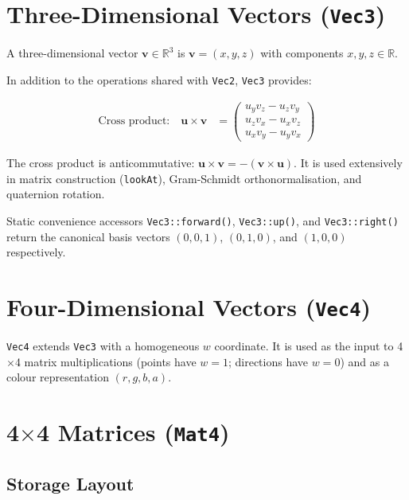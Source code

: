 \section{Three-Dimensional Vectors (\texttt{Vec3})}

\begin{definition}[3-Vector]
A three-dimensional vector $\mathbf{v} \in \mathbb{R}^3$ is
$\mathbf{v} = (x, y, z)$ with components $x, y, z \in \mathbb{R}$.
\end{definition}

In addition to the operations shared with \texttt{Vec2}, \texttt{Vec3}
provides:

\begin{align}
  \text{Cross product:} \quad
  \mathbf{u} \times \mathbf{v} &=
  \begin{pmatrix} u_y v_z - u_z v_y \\ u_z v_x - u_x v_z \\ u_x v_y - u_y v_x \end{pmatrix}
\end{align}

The cross product is anticommutative: $\mathbf{u} \times \mathbf{v} = -(\mathbf{v} \times \mathbf{u})$.
It is used extensively in matrix construction (\texttt{lookAt}),
Gram-Schmidt orthonormalisation, and quaternion rotation.

Static convenience accessors \texttt{Vec3::forward()}, \texttt{Vec3::up()},
and \texttt{Vec3::right()} return the canonical basis vectors
$(0,0,1)$, $(0,1,0)$, and $(1,0,0)$ respectively.

\section{Four-Dimensional Vectors (\texttt{Vec4})}

\texttt{Vec4} extends \texttt{Vec3} with a homogeneous $w$ coordinate.
It is used as the input to 4$\times$4 matrix multiplications (points have
$w = 1$; directions have $w = 0$) and as a colour representation
$(r, g, b, a)$.

\section{4$\times$4 Matrices (\texttt{Mat4})}

\subsection{Storage Layout}

